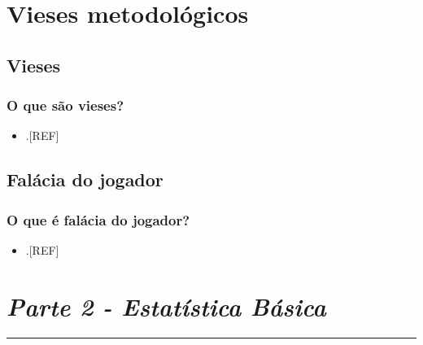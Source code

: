 \documentclass[
  a4paper,
]{book}
\providecommand{\tightlist}{%
  \setlength{\itemsep}{0pt}\setlength{\parskip}{0pt}}
\begin{document}
\hypertarget{vieses-metodologicos}{%
\chapter{\texorpdfstring{\textbf{Vieses metodológicos}}{Vieses metodológicos}}\label{vieses-metodologicos}}

\hypertarget{vieses}{%
\section{Vieses}\label{vieses}}

\hypertarget{o-que-suxe3o-vieses}{%
\subsection{O que são vieses?}\label{o-que-suxe3o-vieses}}

\begin{itemize}
\tightlist
\item
  .{[}REF{]}
\end{itemize}

\hypertarget{jogador}{%
\section{Falácia do jogador}\label{jogador}}

\hypertarget{o-que-uxe9-faluxe1cia-do-jogador}{%
\subsection{O que é falácia do jogador?}\label{o-que-uxe9-faluxe1cia-do-jogador}}

\begin{itemize}
\tightlist
\item
  .{[}REF{]}
\end{itemize}


\hypertarget{parte-2---estatuxedstica-buxe1sica}{%
\chapter*{\texorpdfstring{\emph{Parte 2 - Estatística Básica}}{Parte 2 - Estatística Básica}}\label{parte-2---estatuxedstica-buxe1sica}}

\markboth{}{}
\par\noindent\rule{\textwidth}{0.05in}
\end{document}
